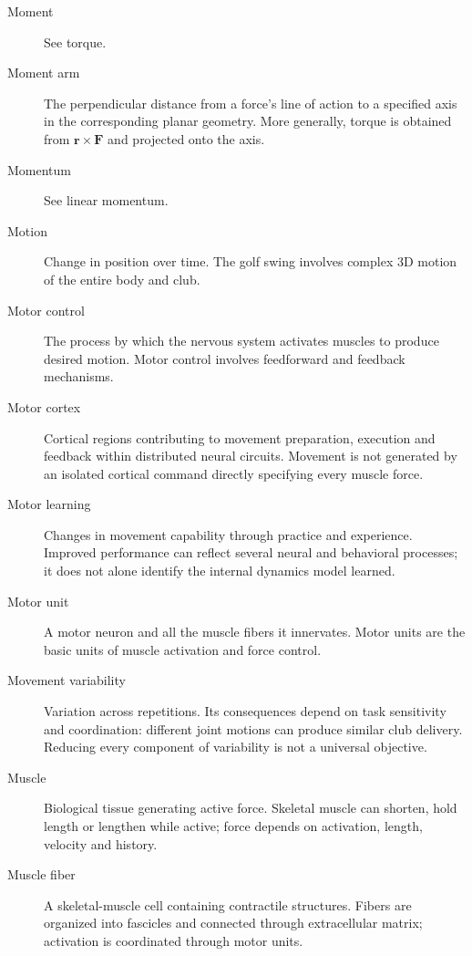 \begin{description}
\item[Moment] See torque.

\item[Moment arm] The perpendicular distance from a force's line of action to a specified axis in the corresponding planar geometry. More generally, torque is obtained from $\mathbf{r}\times\mathbf{F}$ and projected onto the axis.

\item[Momentum] See linear momentum.

\item[Motion] Change in position over time. The golf swing involves complex 3D motion of the entire body and club.

\item[Motor control] The process by which the nervous system activates muscles to produce desired motion. Motor control involves feedforward and feedback mechanisms.

\item[Motor cortex] Cortical regions contributing to movement preparation, execution and feedback within distributed neural circuits. Movement is not generated by an isolated cortical command directly specifying every muscle force.

\item[Motor learning] Changes in movement capability through practice and experience. Improved performance can reflect several neural and behavioral processes; it does not alone identify the internal dynamics model learned.

\item[Motor unit] A motor neuron and all the muscle fibers it innervates. Motor units are the basic units of muscle activation and force control.

\item[Movement variability] Variation across repetitions. Its consequences depend on task sensitivity and coordination: different joint motions can produce similar club delivery. Reducing every component of variability is not a universal objective.

\item[Muscle] Biological tissue generating active force. Skeletal muscle can shorten, hold length or lengthen while active; force depends on activation, length, velocity and history.

\item[Muscle fiber] A skeletal-muscle cell containing contractile structures. Fibers are organized into fascicles and connected through extracellular matrix; activation is coordinated through motor units.


\end{description}
